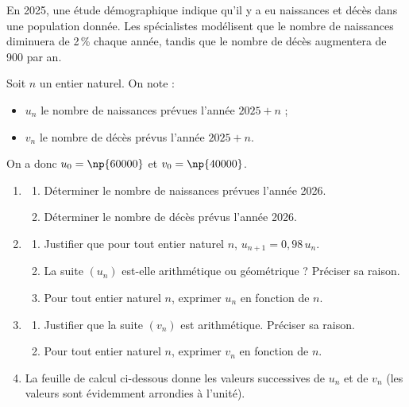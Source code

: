 En 2025, une étude démographique indique qu'il y a eu  naissances et  décès dans une population donnée. Les spécialistes modélisent que le nombre de naissances diminuera de 2\,\% chaque année, tandis que le nombre de décès augmentera de 900 par an.

\medskip

Soit $n$ un entier naturel. On note :
\begin{itemize}[left=5mm]
	\item $u_{n}$ le nombre de naissances prévues l'année $2025+n$ ;
	\item $v_{n}$ le nombre de décès prévus l'année $2025+n$.
\end{itemize}

On a donc $u_{0}=\np{60000}$ et $v_{0}=\np{40000}$.

\begin{enumerate}
	\item
	\begin{enumerate}
		\item Déterminer le nombre de naissances prévues l'année 2026.
		\item Déterminer le nombre de décès prévus l'année 2026.
	\end{enumerate}

	\item
	\begin{enumerate}
		\item Justifier que pour tout entier naturel $n$, $u_{n+1}=0{,}98\,u_{n}$.
		\item La suite $(u_{n})$ est-elle arithmétique ou géométrique ? Préciser sa raison.
		\item Pour tout entier naturel $n$, exprimer $u_{n}$ en fonction de $n$.
	\end{enumerate}

	\item
	\begin{enumerate}
		\item Justifier que la suite $(v_{n})$ est arithmétique. Préciser sa raison.
		\item Pour tout entier naturel $n$, exprimer $v_{n}$ en fonction de $n$.
	\end{enumerate}

	\item La feuille de calcul ci-dessous donne les valeurs successives de $u_{n}$ et de $v_{n}$ (les valeurs sont évidemment arrondies à l'unité).


\end{enumerate}
